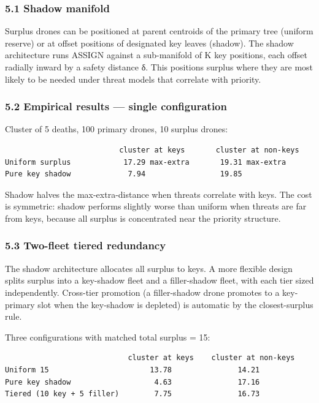 \subsubsection{5.1 Shadow manifold}\label{shadow-manifold}

Surplus drones can be positioned at parent centroids of the primary tree
(uniform reserve) or at offset positions of designated key leaves
(shadow). The shadow architecture runs ASSIGN against a sub-manifold of
K key positions, each offset radially inward by a safety distance δ.
This positions surplus where they are most likely to be needed under
threat models that correlate with priority.

\subsubsection{5.2 Empirical results --- single
configuration}\label{empirical-results-single-configuration}

Cluster of 5 deaths, 100 primary drones, 10 surplus drones:

\begin{verbatim}
                          cluster at keys       cluster at non-keys
Uniform surplus            17.29 max-extra       19.31 max-extra
Pure key shadow             7.94                 19.85
\end{verbatim}

Shadow halves the max-extra-distance when threats correlate with keys.
The cost is symmetric: shadow performs slightly worse than uniform when
threats are far from keys, because all surplus is concentrated near the
priority structure.

\subsubsection{5.3 Two-fleet tiered
redundancy}\label{two-fleet-tiered-redundancy}

The shadow architecture allocates all surplus to keys. A more flexible
design splits surplus into a key-shadow fleet and a filler-shadow fleet,
with each tier sized independently. Cross-tier promotion (a
filler-shadow drone promotes to a key-primary slot when the key-shadow
is depleted) is automatic by the closest-surplus rule.

Three configurations with matched total surplus = 15:

\begin{verbatim}
                            cluster at keys    cluster at non-keys
Uniform 15                       13.78               14.21
Pure key shadow                   4.63               17.16
Tiered (10 key + 5 filler)        7.75               16.73
\end{verbatim}

